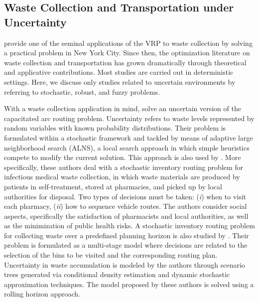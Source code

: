 \documentclass[authoryear,preprint,12pt]{elsarticle}
\begin{document}
\subsection{Waste Collection and Transportation under Uncertainty}\label{VRP}
\cite{Beltrami1974} provide one of the seminal applications of the VRP to waste collection by solving a practical problem in New York City. Since then, the optimization literature on waste collection and transportation has grown dramatically through theoretical and applicative contributions. Most studies are carried out in deterministic settings.
Here, we discuss only studies related to uncertain environments by referring to stochastic, robust, and fuzzy problems.    

With a waste collection application in mind, \cite{Laporte2010} solve an uncertain version of the capacitated arc routing problem. Uncertainty refers to waste levels represented by random variables with known probability distributions. Their problem is formulated within a stochastic framework and tackled 
by means of adaptive large neighborhood search (ALNS), a local search approach in which simple heuristics compete to modify the current solution. This approach is also used by \cite{Nolz2014}. More specifically, these authors deal with a stochastic inventory routing problem  for infectious medical waste collection, in which waste materials are produced by patients in self-treatment, stored at pharmacies, and picked up by local authorities for disposal. Two types of decisions must be taken: (\textit{i}) when to visit each pharmacy, (\textit{ii}) how to sequence vehicle routes. The authors consider social aspects, specifically the satisfaction of pharmacists and local authorities, as well as the minimization of public health risks.  
%
A stochastic inventory routing problem for collecting waste over a predefined planning horizon is also studied by \cite{Spinelli2025}. Their problem is formulated as a multi-stage model where decisions are related to the selection of the bins to be visited and the corresponding routing plan. Uncertainty in waste accumulation is modeled by the authors through scenario trees generated via conditional density estimation and dynamic stochastic approximation techniques. The model proposed by these authors is solved using a rolling horizon approach. 
\end{document}
